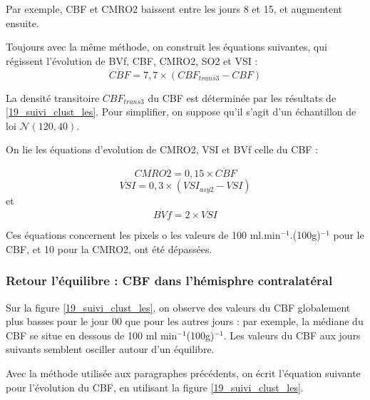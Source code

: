 \begin{enumerate}[label=\textbf{(L\'esion 2 - \arabic*)}]
\par
Par exemple, CBF et CMRO2 baissent entre les jours 8 et 15, et augmentent ensuite.

\par
Toujours avec la m\^eme m\'ethode, on construit les \'equations suivantes, %
qui r\'egissent l'\'evolution de BVf, CBF, CMRO2, SO2 et VSI :
\begin{equation}
\dot{CBF}=7,7\times\left(CBF_{trans3}-CBF\right)
\end{equation}

La densit\'e transitoire $CBF_{trans3}$ du CBF est d\'etermin\'ee par les r\'esultats de \ref{19_suivi_clust_les}. %
Pour simplifier, on suppose qu'il s'agit d'un \'echantillon de loi $\mathcal{N}(120,40)$.

\par
On lie les \'equations d'evolution de CMRO2, VSI et BVf  celle du CBF :

\begin{equation}
\dot{CMRO2}=0,15\times\dot{CBF}
\end{equation}
\begin{equation}
\dot{VSI}=0,3\times (VSI_{asy2}-VSI)
\end{equation}
et%
\begin{equation}
\dot{BVf}=2\times\dot{VSI}
\end{equation}

Ces \'equations concernent les pixels o les valeurs de 100 ml.min${}^{-1}$.(100g)${}^{-1}$ pour le CBF, %
et 10 pour la CMRO2, ont \'et\'e d\'epass\'ees.
\end{enumerate}



\subsubsection{Retour  l'\'equilibre : CBF dans l'h\'emisphre contralat\'eral}

Sur la figure \ref{19_suivi_clust_les}, on observe des valeurs du CBF globalement plus basses pour le jour 00 que pour les autres jours : %
par exemple, la m\'ediane du CBF se situe en dessous de 100 ml min${}^{-1}$(100g)${}^{-1}$. %
Les valeurs du CBF aux jours suivants semblent osciller autour d'un \'equilibre.

\par
Avec la m\'ethode utilis\'ee aux paragraphes pr\'ec\'edents, on \'ecrit l'\'equation suivante pour l'\'evolution du CBF, %
en utilisant la figure \ref{19_suivi_clust_les}.

